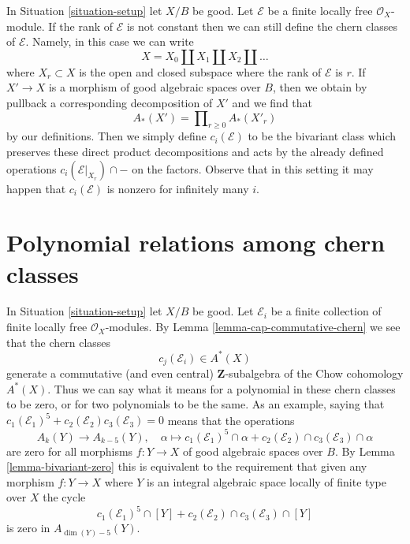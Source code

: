 \begin{remark}
\label{remark-extend-to-finite-locally-free}
In Situation \ref{situation-setup} let $X/B$ be good.
Let $\mathcal{E}$ be a finite locally free $\mathcal{O}_X$-module.
If the rank of $\mathcal{E}$ is not constant then we can
still define the chern classes of $\mathcal{E}$. Namely, in this
case we can write
$$
X = X_0 \amalg X_1 \amalg X_2 \amalg \ldots
$$
where $X_r \subset X$ is the open and closed subspace where
the rank of $\mathcal{E}$ is $r$. If $X' \to X$ is a morphism
of good algebraic spaces over $B$, then we obtain by
pullback a corresponding decomposition of $X'$ and we find that
$$
A_*(X') = \prod\nolimits_{r \geq 0} A_*(X'_r)
$$
by our definitions. Then we simply define $c_i(\mathcal{E})$
to be the bivariant class which preserves these direct
product decompositions and acts by the already defined
operations $c_i(\mathcal{E}|_{X_r}) \cap -$
on the factors. Observe that in this setting it may happen
that $c_i(\mathcal{E})$ is nonzero for infinitely many $i$.
\end{remark}












\section{Polynomial relations among chern classes}
\label{section-relations-chern-classes}

\noindent
In Situation \ref{situation-setup} let $X/B$ be good.
Let $\mathcal{E}_i$ be a finite collection of finite locally
free $\mathcal{O}_X$-modules. By Lemma \ref{lemma-cap-commutative-chern}
we see that the chern classes
$$
c_j(\mathcal{E}_i) \in A^*(X)
$$
generate a commutative (and even central) $\mathbf{Z}$-subalgebra of the
Chow cohomology $A^*(X)$.
Thus we can say what it means for a polynomial in these chern classes
to be zero, or for two polynomials to be the same. As an example, saying that
$c_1(\mathcal{E}_1)^5 + c_2(\mathcal{E}_2)c_3(\mathcal{E}_3) = 0$
means that the operations
$$
A_k(Y) \longrightarrow A_{k - 5}(Y), \quad
\alpha \longmapsto
c_1(\mathcal{E}_1)^5 \cap \alpha +
c_2(\mathcal{E}_2) \cap c_3(\mathcal{E}_3) \cap \alpha
$$
are zero for all morphisms $f : Y \to X$ of good algebraic spaces over $B$.
By Lemma \ref{lemma-bivariant-zero}
this is equivalent to the requirement that given any morphism
$f : Y \to X$ where $Y$ is an integral algebraic space
locally of finite type over $X$ the cycle
$$
c_1(\mathcal{E}_1)^5 \cap [Y] +
c_2(\mathcal{E}_2) \cap c_3(\mathcal{E}_3) \cap [Y]
$$
is zero in $A_{\dim(Y) - 5}(Y)$.

